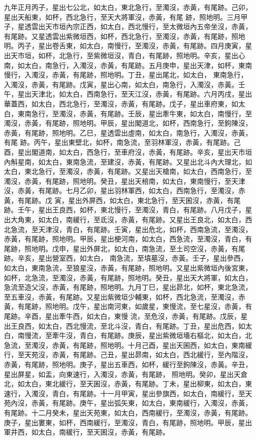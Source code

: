 \begin{pinyinscope}
 九年正月丙子，星出七公北，如太白，東北急行，至濁沒，赤黃，有尾跡。己卯，星出天船東，如杯，西北急行，至天大將軍沒，赤黃，有尾
 跡，照地明。三月甲子，星透雲出天市垣內宗正西，如太白，西北慢行，至太微垣內五帝坐沒，赤黃，有尾跡。又星透雲出紫微垣西，如杯，西北急行，至濁沒，赤黃，有尾跡，照地明。丙子，星出卷舌東，如太白，南慢行，至濁沒，赤黃，有尾跡。四月庚寅，星出天市垣，如杯，北急行，至紫微垣沒，青白，有尾跡，照地明。辛亥，星出心南，如太白，南急行，入濁沒，赤黃，有尾跡。五月庚申，星出天津，如杯，東南慢行，入濁沒，赤黃，有尾跡，照地明。丁丑，星出尾北，如太白，
 東南急行，入濁沒，赤黃，有尾跡。戊寅，星出心南，如太白，南急行，入濁沒，赤黃。壬午，星出天津北，如太白，西南急行，至天江沒，赤黃，有尾跡。六月丙戌，星出華蓋西，如太白，西北急行，至濁沒，赤黃，有尾跡。戊子，星出車府東，如太白，東南急行，至濁沒，赤黃，有尾跡。壬辰，星出牽牛東，如太白，南慢行，至濁沒，赤黃，有尾跡，照地明。甲辰，星出閣道北，如杯，西南急行，至鉤陳沒，赤黃，有尾跡，照地明。乙巳，星透雲出虛南，如太白，南急行，入濁沒，赤黃，有尾
 跡。丙午，星出東壁北，如杯，南急流，至羽林軍沒，赤黃，有尾跡。己酉，星出閣道南，如太白，西急行，至車府沒，赤黃，有尾跡。辛亥，星出天市垣內斛星南，如太白，東南急流，至建沒，赤黃，有尾跡。又星出北斗內大理北，如太白，東北急行，至濁沒，赤黃，有尾跡。又星出天槍南，如太白，西南急行，至濁沒，赤黃，有尾跡，照地明。癸丑，星出天棓南，如太白，東南慢行，至天津沒，赤黃，有尾跡。七月乙卯，星出羽林軍西，如太白，西南急行，至濁沒，赤黃，有尾跡。戊
 寅，星出外屏西，如太白，東北急行，至天囷沒，赤黃，有尾跡。壬午，星出王良西，如杯，東北慢行，至濁沒，青白，有尾跡。八月戊子，星出大角東，如太白，南緩行，至氐沒，赤黃，有尾跡。又星出王良北，如太白，西北急流，至天津沒，青白，有尾跡。壬寅，星出危北，如杯，西南急流，至濁沒，赤黃，有尾跡，照地明。甲辰，星出梗河南，如太白，西急流，至濁沒，青白，有尾跡，照地明。戊申，星出外屏北，如太白，南急流，至土司空沒，赤黃，有尾跡。辛亥，星出營室西，如太白，
 南急流，至墳墓沒，赤黃。壬子，星出參西，如太白，東南急流，至狼星沒，赤黃，有尾跡，照地明。又星出紫微垣內後宮東，如杯，北急流，至濁沒，赤黃，有尾跡，照地明。癸丑，星出天大將軍，如太白，急流至造父沒，赤黃，有尾跡，照地明。九月丁巳，星出昴北，如杯，東北急流，至五車沒，赤黃，有尾跡。又星出紫微垣少輔東，如杯，西北急流，至濁沒，赤黃，有尾跡，照地明。戊午，星出南河東，如歲星，東慢流，至七星沒，赤黃，有尾跡。辛酉，星出牽牛西，如太白，東慢
 流，至危沒，赤黃，有尾跡。戊辰，星出王良西，如太白，西北慢流，至北斗沒，青白，有尾跡。丁丑，星出危西，如太白，南慢流，至牽牛沒，青白，有尾跡。庚辰，星出紫微垣墻右樞北，如太白，北急流，至濁沒，赤黃，有尾跡，照地明。十月己酉，星出天囷西，如太白，東南緩行，至天苑沒，赤黃，有尾跡。己丑，星出昴南，如太白，西北緩行，至內階沒，赤黃，有尾跡，照地明。庚子，星出五車西，如杯，緩行至鉤陳沒，赤黃。辛丑，星出屏星，如盂，向東速行，入濁沒，赤黃，有尾跡，
 照地明。癸卯，星出天倉北，如太白，東北緩行，至天囷沒，赤黃，有尾跡。丁未，星出柳東，如太白，東速行，入濁沒，青白，有尾跡。十一月甲寅，星出參旗西，如太白，南緩行，至天苑內沒，赤黃，有尾跡。庚午，星出弧矢東，如太白，東南緩行，入濁沒，赤黃，有尾跡。十二月癸未，星出天苑東，如太白，西南緩行，至濁沒，赤黃，有尾跡。庚子，星出婁東，如杯，西南緩行，至濁沒，青白，有尾跡，照地明。甲辰，星出軍井西，如太白，南緩行，至天囷沒，赤黃，有尾跡。




\end{pinyinscope}
